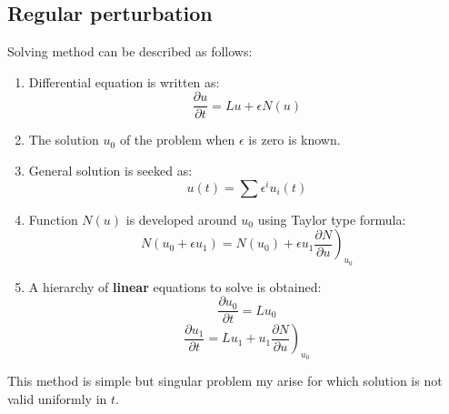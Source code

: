 \documentclass[12pt]{book}
\begin{document}
\subsection{Regular perturbation}
Solving method can be described as follows:
\begin{alg}
\begin{enumerate}
\item Differential equation is written as:
\begin{equation}
\frac{\partial u}{\partial t}=Lu+\epsilon N(u)
\end{equation}
\item The solution $u_0$ of the problem when $\epsilon$ is zero is known.
\item General solution is seeked as:
\begin{equation}
u(t)=\sum \epsilon^i u_i(t)
\end{equation}
\item Function $N(u)$ is developed around $u_0$ using Taylor type formula:
\begin{equation}
N(u_0+\epsilon u_1)=N(u_0)+\epsilon u_1\left.\frac{\partial N}{\partial
    u}\right)_{u_0} 
\end{equation}
\item A hierarchy of  {\bf linear} equations to solve is obtained:
\begin{equation}
\frac{\partial u_0}{\partial t}=Lu_0
\end{equation}
\begin{equation}
\frac{\partial u_1}{\partial t}=Lu_1+u_1\left.\frac{\partial N}{\partial
u}\right)_{u_0} 
\end{equation}
\end{enumerate}
\end{alg}
This method is simple but singular problem my arise for which solution is not
valid uniformly in $t$.
\end{document}
